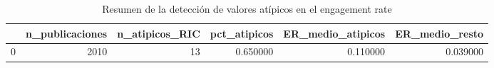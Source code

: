 \begin{table}
\caption{Resumen de la detección de valores atípicos en el engagement rate}
\label{tab:resumen_atipicos}
\begin{tabular}{lrrrrr}
\toprule
 & n\_publicaciones & n\_atipicos\_RIC & pct\_atipicos & ER\_medio\_atipicos & ER\_medio\_resto \\
\midrule
0 & 2010 & 13 & 0.650000 & 0.110000 & 0.039000 \\
\bottomrule
\end{tabular}
\end{table}
